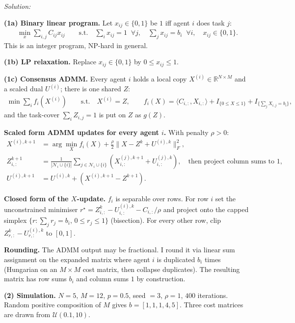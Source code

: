 \documentclass[a4paper, 11pt]{article}
\newenvironment{solution}
    {\textit{Solution:}}
    {}
\begin{document}
\begin{solution}

\textbf{(1a) Binary linear program.} Let $x_{ij} \in \{0, 1\}$ be $1$ iff agent $i$ does task $j$:
\begin{align*}
    \min_{x} \sum_{i,j} C_{ij} x_{ij} \qquad \text{s.t.} \quad \sum_i x_{ij} = 1 \;\; \forall j, \quad \sum_j x_{ij} = b_i \;\; \forall i, \quad x_{ij} \in \{0, 1\}.
\end{align*}
This is an integer program, NP-hard in general.

\textbf{(1b) LP relaxation.} Replace $x_{ij} \in \{0,1\}$ by $0 \le x_{ij} \le 1$.

\textbf{(1c) Consensus ADMM.} Every agent $i$ holds a local copy $X^{(i)} \in \mathbb{R}^{N \times M}$ and a scaled dual $U^{(i)}$; there is one shared $Z$:
\begin{align*}
    \min \sum_i f_i(X^{(i)}) \qquad \text{s.t.} \quad X^{(i)} = Z, \qquad f_i(X) = \langle C_{i,:}, X_{i,:}\rangle + I_{\{0 \le X \le 1\}} + I_{\{\sum_j X_{i,j} = b_i\}},
\end{align*}
and the task-cover $\sum_i Z_{i,j} = 1$ is put on $Z$ as $g(Z)$.

\textbf{Scaled form ADMM updates for every agent $i$.} With penalty $\rho > 0$:
\begin{align*}
    X^{(i),k+1} &= \arg\min_X f_i(X) + \tfrac{\rho}{2}\|X - Z^k + U^{(i),k}\|_F^2, \\
    Z^{k+1}_{i,:} &= \tfrac{1}{|\mathcal{N}_i \cup \{i\}|} \sum_{j \in \mathcal{N}_i \cup \{i\}} (X^{(j),k+1}_{i,:} + U^{(j),k}_{i,:}), \quad \text{then project column sums to } 1, \\
    U^{(i),k+1} &= U^{(i),k} + (X^{(i),k+1} - Z^{k+1}).
\end{align*}

\textbf{Closed form of the $X$-update.} $f_i$ is separable over rows. For row $i$ set the unconstrained minimiser $r^{\star} = Z^k_{i,:} - U^{(i),k}_{i,:} - C_{i,:}/\rho$ and project onto the capped simplex $\{r : \sum_j r_j = b_i,\, 0 \le r_j \le 1\}$ (bisection). For every other row, clip $Z^k_{r,:} - U^{(i),k}_{r,:}$ to $[0, 1]$.

\textbf{Rounding.} The ADMM output may be fractional. I round it via linear sum assignment on the expanded matrix where agent $i$ is duplicated $b_i$ times (Hungarian on an $M \times M$ cost matrix, then collapse duplicates). The resulting matrix has row sums $b_i$ and column sums $1$ by construction.

\textbf{(2) Simulation.} $N = 5$, $M = 12$, $p = 0.5$, seed $= 3$, $\rho = 1$, $400$ iterations. Random positive composition of $M$ gives $b = [1, 1, 1, 4, 5]$. Three cost matrices are drawn from $\mathcal{U}(0.1, 10)$.


\end{solution}
\end{document}

